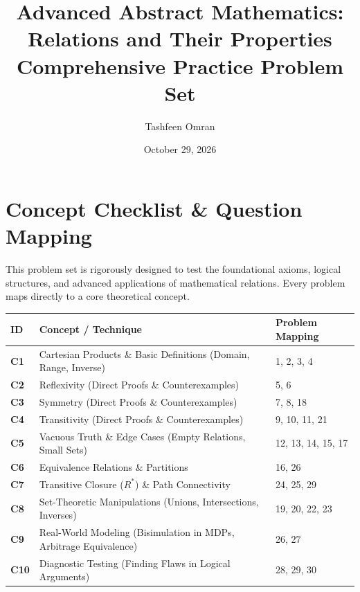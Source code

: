 \documentclass[11pt, a4paper]{article}
\theoremstyle{definition}
\theoremstyle{remark}
\begin{document}
\title{\textbf{Advanced Abstract Mathematics: Relations and Their Properties \\ \Large Comprehensive Practice Problem Set}}
\author{Tashfeen Omran}
\date{October 29, 2026}

\maketitle
\tableofcontents
\newpage

\section{Concept Checklist \& Question Mapping}
\label{sec:checklist_start}

This problem set is rigorously designed to test the foundational axioms, logical structures, and advanced applications of mathematical relations. Every problem maps directly to a core theoretical concept.

\vspace{1em}
\noindent
\begin{tabularx}{\textwidth}{>{\bfseries}l X l}
\toprule
ID & Concept / Technique & Problem Mapping \\
\midrule
C1 & Cartesian Products \& Basic Definitions (Domain, Range, Inverse) & 1, 2, 3, 4 \\
\addlinespace[4pt]
C2 & Reflexivity (Direct Proofs \& Counterexamples) & 5, 6 \\
\addlinespace[4pt]
C3 & Symmetry (Direct Proofs \& Counterexamples) & 7, 8, 18 \\
\addlinespace[4pt]
C4 & Transitivity (Direct Proofs \& Counterexamples) & 9, 10, 11, 21 \\
\addlinespace[4pt]
C5 & Vacuous Truth \& Edge Cases (Empty Relations, Small Sets) & 12, 13, 14, 15, 17 \\
\addlinespace[4pt]
C6 & Equivalence Relations \& Partitions & 16, 26 \\
\addlinespace[4pt]
C7 & Transitive Closure ($R^*$) \& Path Connectivity & 24, 25, 29 \\
\addlinespace[4pt]
C8 & Set-Theoretic Manipulations (Unions, Intersections, Inverses) & 19, 20, 22, 23 \\
\addlinespace[4pt]
C9 & Real-World Modeling (Bisimulation in MDPs, Arbitrage Equivalence) & 26, 27 \\
\addlinespace[4pt]
C10 & Diagnostic Testing (Finding Flaws in Logical Arguments) & 28, 29, 30 \\
\bottomrule
\end{tabularx}
\end{document}
